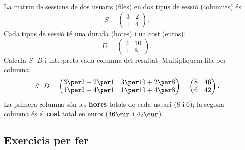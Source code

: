 \begin{exresolt}
La matriu de sessions de dos usuaris (files) en dos tipus de sessió (columnes) és
\[
S=\begin{pmatrix} 3 & 2 \\ 1 & 4 \end{pmatrix}.
\]
Cada tipus de sessió té una durada (hores) i un cost (euros):
\[
D=\begin{pmatrix} 2 & 10 \\ 1 & 8 \end{pmatrix}.
\]
Calcula $S\cdot D$ i interpreta cada columna del resultat.
\solucio
Multipliquem fila per columna:
\[
S\cdot D=\begin{pmatrix} 3\per 2+2\per 1 & 3\per 10+2\per 8 \\ 1\per 2+4\per 1 & 1\per 10+4\per 8 \end{pmatrix}
        =\begin{pmatrix} 8 & 46 \\ 6 & 42 \end{pmatrix}.
\]
La primera columna són les \textbf{hores} totals de cada usuari ($8$ i $6$); la
segona columna és el \textbf{cost} total en euros ($46\eur$ i $42\eur$).
\end{exresolt}

\subsection{Exercicis per fer}

